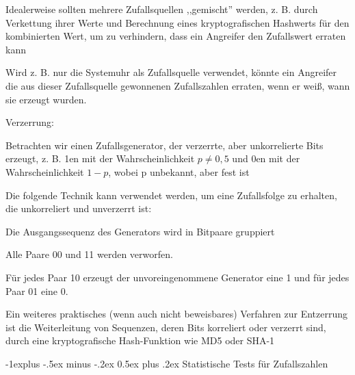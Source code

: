 \documentclass[a4paper]{article}
\makeatletter
\renewcommand{\subsection}{\@startsection{subsection}{2}{0mm}%
 {-1explus -.5ex minus -.2ex}%
 {0.5ex plus .2ex}%
 {\normalfont\normalsize\bfseries}}
\makeatother
\begin{document}
\begin{multicols}{3}
\begin{itemize*}
\begin{itemize*}
            \end{itemize*}
            \item Idealerweise sollten mehrere Zufallsquellen ,,gemischt'' werden, z. B.
            durch Verkettung ihrer Werte und Berechnung eines kryptografischen
            Hashwerts für den kombinierten Wert, um zu verhindern, dass ein
            Angreifer den Zufallswert erraten kann
            \begin{itemize*}
                  \item Wird z. B. nur die Systemuhr als Zufallsquelle verwendet, könnte ein Angreifer die aus dieser Zufallsquelle gewonnenen Zufallszahlen erraten, wenn er weiß, wann sie erzeugt wurden.
            \end{itemize*}
            \item Verzerrung:
            \begin{itemize*}
                  \item Betrachten wir einen Zufallsgenerator, der verzerrte, aber unkorrelierte Bits erzeugt, z. B. 1en mit der Wahrscheinlichkeit $p\not= 0,5$ und 0en mit der Wahrscheinlichkeit $1-p$, wobei p unbekannt, aber fest ist
            \end{itemize*}
            \item Die folgende Technik kann verwendet werden, um eine Zufallsfolge zu
            erhalten, die unkorreliert und unverzerrt ist:
            \begin{itemize*}
                  \item Die Ausgangssequenz des Generators wird in Bitpaare gruppiert
                  \item Alle Paare 00 und 11 werden verworfen.
                  \item Für jedes Paar 10 erzeugt der unvoreingenommene Generator eine 1 und für jedes Paar 01 eine 0.
            \end{itemize*}
            \item Ein weiteres praktisches (wenn auch nicht beweisbares) Verfahren zur
            Entzerrung ist die Weiterleitung von Sequenzen, deren Bits korreliert
            oder verzerrt sind, durch eine kryptografische Hash-Funktion wie MD5
            oder SHA-1
      \end{itemize*}


      \subsection{Statistische Tests für
            Zufallszahlen}


\end{multicols}
\end{document}
